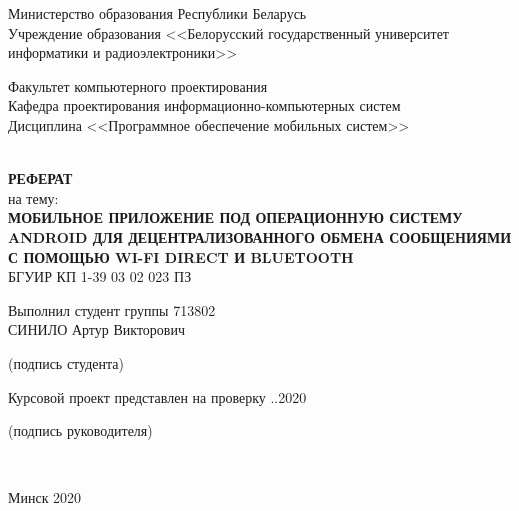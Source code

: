 
\begin{titlepage}
  \begin{center}
    Министерство образования Республики Беларусь\\
    Учреждение образования <<Белорусский государственный университет информатики и радиоэлектроники>>\\[4em]

    \begin{minipage}{\textwidth}
      \begin{flushleft}
		  Факультет компьютерного проектирования\\[1em]

		  Кафедра проектирования информационно-компьютерных систем\\[1em]

		  Дисциплина <<Программное обеспечение мобильных систем>>\\[1em]
      \end{flushleft}
    \end{minipage}\\[2em]

	\textbf{\MakeTextUppercase{Реферат}}\\
    {на тему:}\\
	\textbf{\MakeTextUppercase{Мобильное приложение под операционную систему Android для децентрализованного обмена сообщениями с помощью Wi-Fi Direct и Bluetooth}}\\[1em]

	{БГУИР КП 1-39 03 02 023 ПЗ}\\[2em]

    \begin{flushright}
      \begin{minipage}{0.5\textwidth}
        \begin{flushleft}
          Выполнил студент группы 713802\\
		  \MakeTextUppercase{Синило} Артур Викторович\\
		  \underline{\hspace*{8cm}}

		  {
		    \centerline{\footnotesize{(подпись студента)}}
	      }

          Курсовой проект представлен на проверку
		  \underline{\hspace*{2em}}.\underline{\hspace*{2em}}.2020\\
		  \underline{\hspace*{8cm}}

		  {
		    \centerline{\footnotesize{(подпись руководителя)}}
	      }
        \end{flushleft}
      \end{minipage}\\[2.2em]
    \end{flushright}

        \vfill
    {\normalsize Минск 2020}
  \end{center}
\end{titlepage}
